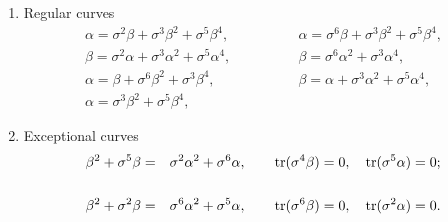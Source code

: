\documentclass[quantumrep,article,submit,pdftex,moreauthors]{Definitions/mdpi}
\DeclareMathOperator{\tr}{tr}
\providecommand{\DIFaddbegin}{} %
\providecommand{\DIFaddend}{} %
\providecommand{\DIFdelbegin}{} %
\providecommand{\DIFdelend}{} %
\begin{document}
\begin{enumerate}[label = \alph*)]
  \item Regular curves 
    \begin{equation}
      \DIFdelbegin %
\DIFdelend \DIFaddbegin \begin{array}{ll}
        \alpha = \sigma^{2}\beta + \sigma^{3}\beta^{2} + \sigma^{5}\beta^{4},
        \qquad\qquad
        & \alpha = \sigma^{6}\beta + \sigma^{3}\beta^{2} + \sigma^{5}\beta^{4},
        \\[5pt] 
        \beta = \sigma^{2}\alpha + \sigma^{3}\alpha^{2} + \sigma^{5}\alpha^{4},
        \qquad\qquad
        & \beta = \sigma^{6}\alpha^{2} + \sigma^{3}\alpha^{4}, \\[5pt] 
        \alpha = \beta + \sigma^{6}\beta^{2} + \sigma^{3}\beta^{4},
        \qquad\qquad
        & \beta = \alpha + \sigma^{3}\alpha^{2} + \sigma^{5}\alpha^{4}, \\[5pt] 
        \alpha = \sigma^{3}\beta^{2} + \sigma^{5}\beta^{4},
        \qquad\qquad
        & 
      \end{array}\DIFaddend %
    \end{equation}

  \item Exceptional curves 
    \begin{eqnarray}
      \beta ^{2}+\sigma ^{5}\beta
      &=& \sigma ^{2}\alpha ^{2}+\sigma ^{6}\alpha,
      \qquad \tr(\sigma ^{4}\beta )=0,\quad \tr(\sigma ^{5}\alpha ) = 0;
      \DIFdelbegin %
\DIFdelend \DIFaddbegin \notag \DIFaddend \\
      && \\
      \beta^{2}+\sigma ^{2}\beta
      &=& \sigma^{6}\alpha^{2} + \sigma^{5}\alpha,
      \qquad \tr(\sigma^{6}\beta) = 0,
      \quad \tr(\sigma ^{2}\alpha ) = 0.
      \DIFdelbegin %
\DIFdelend \DIFaddbegin \notag
    \DIFaddend \end{eqnarray}
\end{enumerate}
\end{document}
